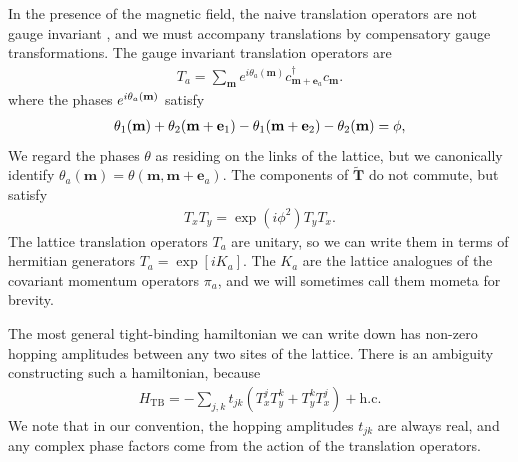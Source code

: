 \documentclass[aps,prb,twocolumn,letterpaper,twoside,nobalancelastpage,groupedaddress,amsmath,amssymb,floatfix,citeautoscript]{revtex4-1}
\begin{document}
In the presence of the magnetic field, the naive translation operators are not gauge invariant \cite{fradkin_field_2013}, and we must accompany translations by compensatory gauge transformations. The gauge invariant translation operators are
\begin{align*}
T_a = \sum_{\mathbf{m}} e^{i\theta_a(\mathbf{m})} c^{\dag}_{\mathbf{m} + \mathbf{e}_a}c_{\mathbf{m}}.
\end{align*}
where the phases $e^{i\theta_a(\mathbf{m})}$ satisfy 
\begin{align*}
\theta_1(\mathbf{m}) + \theta_2(\mathbf{m} + \mathbf{e}_1) - \theta_1(\mathbf{m} + \mathbf{e}_2) - \theta_2(\mathbf{m}) = \phi,
\end{align*}
We regard the phases $\theta$ as residing on the links of the lattice, but we canonically identify $\theta_a(\mathbf{m}) = \theta(\mathbf{m},\mathbf{m}+\mathbf{e}_a)$. The components of $\widetilde{\mathbf{T}}$ do not commute, but satisfy 
\begin{align*}
T_x T_y = \exp(i\phi^2) T_y T_x.
\end{align*}
The lattice translation operators $T_a$ are unitary, so we can write them in terms of hermitian generators $T_a = \exp\left[i K_a\right]$. The $K_a$ are the lattice analogues of the covariant momentum operators $\pi_a$, and we will sometimes call them mometa for brevity.


The most general tight-binding hamiltonian we can write down has non-zero hopping amplitudes between any two sites of the lattice. There is an ambiguity constructing such a hamiltonian, because 
\begin{align*}
H_{\text{TB}} = -\sum_{j,k} t_{jk}\left(T_x^j T_y^k + T_y^kT_x^j\right) + \text{h.c.}
\end{align*}
We note that in our convention, the hopping amplitudes $t_{jk}$ are always real, and any complex phase factors come from the action of the translation operators.
\end{document}
